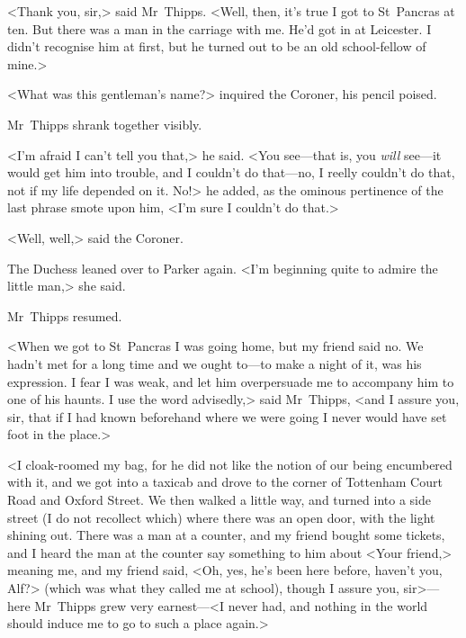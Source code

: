 <Thank you, sir,> said Mr~Thipps. <Well, then, it's true I got to St~Pancras at ten. But there was a man in the carriage with me. He'd got in at Leicester. I didn't recognise him at first, but he turned out to be an old school-fellow of mine.>

<What was this gentleman's name?> inquired the Coroner, his pencil poised.

Mr~Thipps shrank together visibly.

<I'm afraid I can't tell you that,> he said. <You see—that is, you \textit{will} see—it would get him into trouble, and I couldn't do that—no, I reelly couldn't do that, not if my life depended on it. No!> he added, as the ominous pertinence of the last phrase smote upon him, <I'm sure I couldn't do that.>

<Well, well,> said the Coroner.

The Duchess leaned over to Parker again. <I'm beginning quite to admire the little man,> she said.

Mr~Thipps resumed.

<When we got to St~Pancras I was going home, but my friend said no. We hadn't met for a long time and we ought to—to make a night of it, was his expression. I fear I was weak, and let him overpersuade me to accompany him to one of his haunts. I use the word advisedly,> said Mr~Thipps, <and I assure you, sir, that if I had known beforehand where we were going I never would have set foot in the place.>

<I cloak-roomed my bag, for he did not like the notion of our being encumbered with it, and we got into a taxicab and drove to the corner of Tottenham Court Road and Oxford Street. We then walked a little way, and turned into a side street (I do not recollect which) where there was an open door, with the light shining out. There was a man at a counter, and my friend bought some tickets, and I heard the man at the counter say something to him about <Your friend,> meaning me, and my friend said, <Oh, yes, he's been here before, haven't you, Alf?> (which was what they called me at school), though I assure you, sir>—here Mr~Thipps grew very earnest—<I never had, and nothing in the world should induce me to go to such a place again.>

